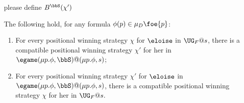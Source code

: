 \btbs
\item
please define $B^\bbS(\chi')$
\etbs

\begin{proposition}\label{p:unfold=evalgame2}
The following hold, for any formula $\phi(p) \in \mu_{D}\foe{p}$:
\begin{enumerate}[(1)]
\item For every positional winning strategy $\chi$ for $\eloise$ in $\UG_F@s$,
there is a compatible positional winning strategy $\chi'$ for her in 
$\egame(\mu p.\phi,\bbS)@(\mu p.\phi,s)$;
\item For every positional winning strategy $\chi'$ for $\eloise$ in 
$\egame(\mu p.\phi,\bbS)@(\mu p.\phi,s)$, there is a compatible  positional 
winning strategy $\chi$ for her in $\UG_F@s$.
\end{enumerate}
\end{proposition}

